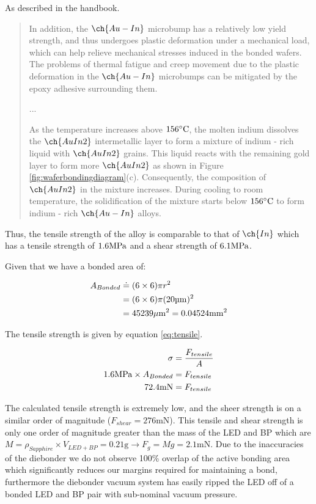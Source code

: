 As described in the handbook.
\begin{quote}
    In addition, the  $\ch{Au - In}$ microbump has a relatively low yield strength, and thus undergoes plastic deformation under a mechanical load, which can help relieve mechanical stresses induced in the bonded wafers. The problems of thermal fatigue and creep movement due to the plastic deformation in the  $\ch{Au - In}$ microbumps can be mitigated by the epoxy adhesive surrounding them.

...

    As the temperature increases above $156\dC$, the molten indium dissolves the $\ch{AuIn2}$ intermetallic layer to form a mixture of indium - rich liquid with $\ch{AuIn2}$ grains. This liquid reacts with the remaining gold layer to form more $\ch{AuIn2}$ as shown in Figure \ref{fig:waferbondingdiagram}(c). Consequently, the composition of $\ch{AuIn2}$ in the mixture increases. During cooling to room temperature, the solidification of the mixture starts below $156\dC$ to form indium - rich $\ch{Au - In}$ alloys.
\end{quote}

Thus, the tensile strength of the alloy is comparable to that of $\ch{In}$ which has a tensile strength of $1.6 \mpa$ \cite{indiumCorpConstants} and a shear strength of $6.1 \mpa$.

Given that we have a bonded area of:


\begin{equation} \label{eq:bonded_area}
    \begin{split}
        A_{Bonded} &\doteq (6\times 6) \pi r^2 \\
        &= (6\times 6) \pi (20 \um)^2 \\
        &= 45239 \umm = 0.04524 \mm^2
    \end{split}
\end{equation}

The tensile strength is given by equation \ref{eq:tensile}.

\begin{equation} \label{eq:tensile}
    \begin{split}
        \sigma &= \frac{F_{tensile}}{A} \\
        1.6 \mpa \times A_{Bonded} &= F_{tensile} \\
        72.4 \unit{\milli\newton} &= F_{tensile}
    \end{split}
\end{equation}

The calculated tensile strength is extremely low, and the sheer strength is on a similar order of magnitude ($F_{shear} = 276 \unit{\milli\newton}$). This tensile and shear strength is only one order of magnitude greater than the mass of the LED and BP which are $M = \rho_{Sapphire} \times V_{LED + BP} = 0.21 \unit{\gram} \rightarrow F_{g} = M g = 2.1 \unit{\milli\newton}$. Due to the inaccuracies of the diebonder we do not observe 100\% overlap of the active bonding area which significantly reduces our margins required for maintaining a bond, furthermore the diebonder vacuum system has easily ripped the LED off of a bonded LED and BP pair with sub-nominal vacuum pressure.

